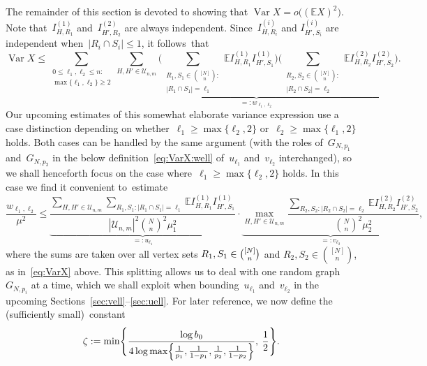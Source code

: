 \documentclass{article}
\newcommand{\E}{\mathbb{E}}
\DeclareMathOperator{\var}{Var}
\newcommand{\T}{\mathcal{U}_{n,m}}
\newcommand\abs[1]{\left|#1\right|}
\newcommand{\ione}{I^{(1)}}
\newcommand{\itwo}{I^{(2)}}
\newcommand\Var{\operatorname{Var}}
\renewcommand{\u}{u}
\renewcommand{\v}{v}
\newcommand\bigpar[1]{\bigl(#1\bigr)}
\newcommand\biggpar[1]{\biggl(#1\biggr)}
\newcommand\Biggpar[1]{\Biggl(#1\Biggr)}
\newcommand\Bigcpar[1]{\Bigl\{#1\Bigr\}}
\newcommand\Biggcpar[1]{\Biggl\{#1\Biggr\}}
\begin{document}
The remainder of this section is devoted  to showing that $\Var X = o\bigpar{(\E X)^2}$. 
Note that~$I^{(1)}_{H,R_1}$ and~$I^{(2)}_{H',R_2}$ are always independent. Since~$I^{(i)}_{H,R_i}$ and $I^{(i)}_{H',S_i}$ are independent when~$\abs{R_i \cap S_i} \leq 1$, it follows~that 
\begin{equation}\label{eq:VarX}
\var X \leq \sum_{\substack{0 \le \ell_1,\ell_2 \le n:\\ \max\{\ell_1,\ell_2\}\geq 2}}\underbrace{\sum_{H,H'\in \T} \Biggpar{\sum_{\substack{R_1,S_1 \in \binom{[N]}{n}:\\ |R_1\cap S_1|=\ell_1}} \E \ione_{H,R_1}\ione_{H',S_1}}\biggpar{\sum_{\substack{R_2,S_2 \in \binom{[N]}{n}:\\ |R_2\cap S_2|=\ell_2}}\E \itwo_{H,R_2}\itwo_{H',S_2}}}_{=: w_{\ell_1,\ell_2}} .
\end{equation}
Our upcoming estimates of this somewhat elaborate variance expression use a case distinction depending on whether~$\ell_1\ge \max\{\ell_2,2\}$ or~$\ell_2\ge \max\{\ell_1,2\}$ holds. 
Both cases can be handled by the same argument (with the roles of~$G_{N,p_1}$ and~$G_{N,p_2}$ in the below definition~\eqref{eq:VarX:well} of~$u_{\ell_1}$ and~$v_{\ell_2}$ interchanged), so we shall henceforth focus on the case where~$\ell_1\ge \max\{\ell_2,2\}$ holds. 
In this case we find it convenient to~estimate
\begin{equation}\label{eq:VarX:well}
\frac{w_{\ell_1,\ell_2}}{\mu^2}
\le \underbrace{\frac{\sum_{H,H'\in \T}\sum_{R_1,S_1:|R_1\cap S_1|=\ell_1} \E \ione_{H,R_1}\ione_{H',S_1}}{|\T|^2\binom{N}{n}^2\mu_1^2}}_{=:\u_{\ell_1}} \cdot \underbrace{\max_{H,H'\in \T} \frac{\sum_{R_2,S_2:|R_2\cap S_2|=\ell_2}\E \itwo_{H,R_2}\itwo_{H',S_2}}{\binom{N}{n}^2\mu_2^2}}_{=:\v_{\ell_2}},
\end{equation}
where the sums are taken over all vertex sets $R_1,S_1 \in \tbinom{[N]}{n}$ and $R_2,S_2 \in \binom{[N]}{n}$, as in~\eqref{eq:VarX} above.
This splitting allows us to deal with one random graph~$G_{N,p_i}$ at a time, 
which we shall exploit when bounding~$u_{\ell_1}$ and~$v_{\ell_2}$ in the upcoming Sections~\ref{sec:vell}--\ref{sec:uell}. 
For later reference, we now define the (sufficiently small)~constant
\begin{equation}\label{eq:def:zeta}
\zeta := \min\Biggcpar{\frac{\log b_0}{4\log \max\Bigcpar{\frac{1}{p_1},\frac{1}{1-p_1},\frac{1}{p_2},\frac{1}{1-p_2}}}, \: \frac{1}{2}}.
\end{equation}
\end{document}
